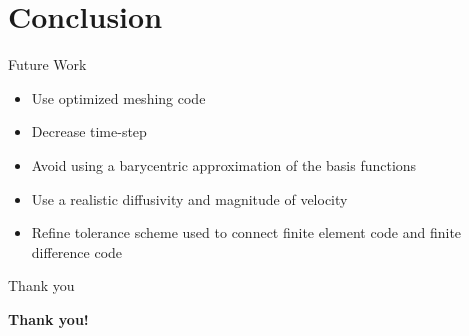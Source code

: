 \documentclass[10pt]{beamer}
\begin{document}
\section{Conclusion}

\begin{frame}{Future Work} \label{FW}
\begin{itemize}
\item Use optimized meshing code
\item Decrease time-step
\item Avoid using a barycentric approximation of the basis functions
\item Use a realistic diffusivity and magnitude of velocity
\item Refine tolerance scheme used to connect finite element code and finite difference code
\end{itemize}
\hyperlink{Questions}{}
\end{frame}

\begin{frame}{Thank you}
    \begin{center}
        {\bf Thank you!}
    \end{center}
\end{frame}
\end{document}
